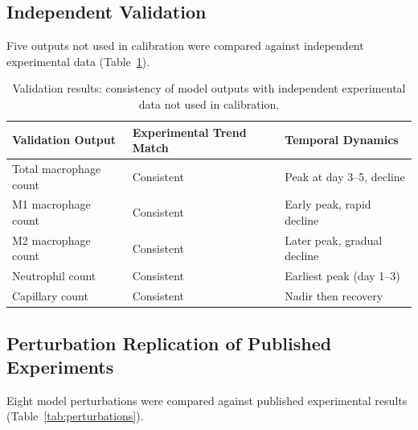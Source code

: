 \documentclass[11pt]{article}
\begin{document}
\subsection{Independent Validation}

Five outputs not used in calibration were compared against independent experimental data (Table~\ref{tab:validation}).

\begin{table}[H]
\centering
\caption{Validation results: consistency of model outputs with independent experimental data not used in calibration.}
\label{tab:validation}
\begin{tabular}{lll}
\toprule
\textbf{Validation Output} & \textbf{Experimental Trend Match} & \textbf{Temporal Dynamics} \\
\midrule
Total macrophage count & Consistent & Peak at day 3--5, decline \\
M1 macrophage count & Consistent & Early peak, rapid decline \\
M2 macrophage count & Consistent & Later peak, gradual decline \\
Neutrophil count & Consistent & Earliest peak (day 1--3) \\
Capillary count & Consistent & Nadir then recovery \\
\bottomrule
\end{tabular}
\end{table}

\subsection{Perturbation Replication of Published Experiments}

Eight model perturbations were compared against published experimental results (Table~\ref{tab:perturbations}).
\end{document}
